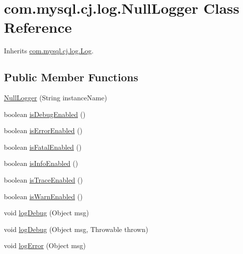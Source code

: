 \hypertarget{classcom_1_1mysql_1_1cj_1_1log_1_1_null_logger}{}\section{com.\+mysql.\+cj.\+log.\+Null\+Logger Class Reference}
\label{classcom_1_1mysql_1_1cj_1_1log_1_1_null_logger}


Inherits \mbox{\hyperlink{interfacecom_1_1mysql_1_1cj_1_1log_1_1_log}{com.\+mysql.\+cj.\+log.\+Log}}.

\subsection*{Public Member Functions}
\begin{DoxyCompactItemize}
\item 
\mbox{\hyperlink{classcom_1_1mysql_1_1cj_1_1log_1_1_null_logger_ac4173d37309f6795e73b6fbbee44b5b5}{Null\+Logger}} (String instance\+Name)
\item 
boolean \mbox{\hyperlink{classcom_1_1mysql_1_1cj_1_1log_1_1_null_logger_acd9c06dcf57d15d16653d31aca25d885}{is\+Debug\+Enabled}} ()
\item 
boolean \mbox{\hyperlink{classcom_1_1mysql_1_1cj_1_1log_1_1_null_logger_af10dc1e8e5216c051f786d1d7578bb07}{is\+Error\+Enabled}} ()
\item 
boolean \mbox{\hyperlink{classcom_1_1mysql_1_1cj_1_1log_1_1_null_logger_a70814db9a009e9da80bc67c4e084120c}{is\+Fatal\+Enabled}} ()
\item 
boolean \mbox{\hyperlink{classcom_1_1mysql_1_1cj_1_1log_1_1_null_logger_af0ad62bbe84bd85359d474e58cd94316}{is\+Info\+Enabled}} ()
\item 
boolean \mbox{\hyperlink{classcom_1_1mysql_1_1cj_1_1log_1_1_null_logger_aec3c94f0980a5539603a7ab12b270356}{is\+Trace\+Enabled}} ()
\item 
boolean \mbox{\hyperlink{classcom_1_1mysql_1_1cj_1_1log_1_1_null_logger_ae2749400e4e820f091a583795111f5a7}{is\+Warn\+Enabled}} ()
\item 
void \mbox{\hyperlink{classcom_1_1mysql_1_1cj_1_1log_1_1_null_logger_ae46ab625efa73570bb45757cacdf32f4}{log\+Debug}} (Object msg)
\item 
void \mbox{\hyperlink{classcom_1_1mysql_1_1cj_1_1log_1_1_null_logger_aafdb325726af974c0ebfd5c134e934e4}{log\+Debug}} (Object msg, Throwable thrown)
\item 
void \mbox{\hyperlink{classcom_1_1mysql_1_1cj_1_1log_1_1_null_logger_aa955e1f3a7fa6eaa275d60833b56ce79}{log\+Error}} (Object msg)

\end{DoxyCompactItemize}
